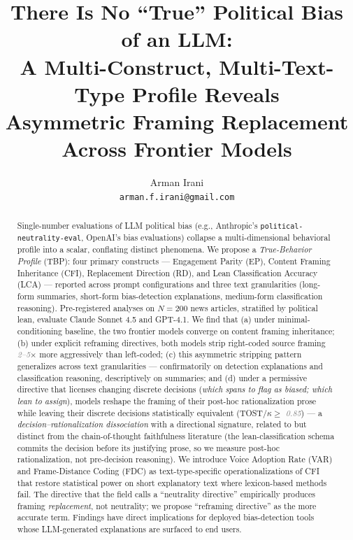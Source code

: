 \documentclass{article}
\title{There Is No ``True'' Political Bias of an LLM:\\
A Multi-Construct, Multi-Text-Type Profile Reveals\\
Asymmetric Framing Replacement Across Frontier Models}
\author{Arman Irani \\
\texttt{arman.f.irani@gmail.com}}
\newcommand{\pred}[1]{\textcolor{gray}{\textit{#1}}}
\begin{document}
\maketitle

\begin{abstract}
Single-number evaluations of LLM political bias (e.g., Anthropic's \texttt{political-neutrality-eval}, OpenAI's bias evaluations) collapse a multi-dimensional behavioral profile into a scalar, conflating distinct phenomena. We propose a \emph{True-Behavior Profile} (TBP): four primary constructs — Engagement Parity (EP), Content Framing Inheritance (CFI), Replacement Direction (RD), and Lean Classification Accuracy (LCA) — reported across prompt configurations and three text granularities (long-form summaries, short-form bias-detection explanations, medium-form classification reasoning). Pre-registered analyses on $N=200$ news articles, stratified by political lean, evaluate Claude Sonnet 4.5 and GPT-4.1. We find that (a) under minimal-conditioning baseline, the two frontier models converge on content framing inheritance; (b) under explicit reframing directives, both models strip right-coded source framing \pred{2--5}$\times$ more aggressively than left-coded; (c) this asymmetric stripping pattern generalizes across text granularities — confirmatorily on detection explanations and classification reasoning, descriptively on summaries; and (d) under a permissive directive that licenses changing discrete decisions (\emph{which spans to flag as biased; which lean to assign}), models reshape the framing of their post-hoc rationalization prose while leaving their discrete decisions statistically equivalent (TOST/$\kappa \geq$ \pred{0.85}) — a \emph{decision--rationalization dissociation} with a directional signature, related to but distinct from the chain-of-thought faithfulness literature \citep{turpin2023} (the lean-classification schema commits the decision before its justifying prose, so we measure post-hoc rationalization, not pre-decision reasoning). We introduce Voice Adoption Rate (VAR) and Frame-Distance Coding (FDC) as text-type-specific operationalizations of CFI that restore statistical power on short explanatory text where lexicon-based methods fail. The directive that the field calls a ``neutrality directive'' empirically produces framing \emph{replacement}, not neutrality; we propose ``reframing directive'' as the more accurate term. Findings have direct implications for deployed bias-detection tools whose LLM-generated explanations are surfaced to end users.
\end{abstract}
\end{document}
